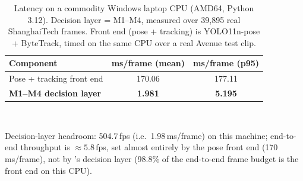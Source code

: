\begin{table}[t]
\centering
\caption{Latency on a commodity Windows laptop CPU (AMD64, Python 3.12).
Decision layer = M1--M4, measured over 39{,}895 real ShanghaiTech frames.
Front end (pose + tracking) is YOLO11n-pose + ByteTrack, timed on the same
CPU over a real Avenue test clip.}
\label{tab:cost}
\setlength{\tabcolsep}{6pt}
\renewcommand{\arraystretch}{1.15}
\footnotesize
\begin{tabular}{@{}lcc@{}}
\toprule
Component & ms/frame (mean) & ms/frame (p95) \\
\midrule
Pose + tracking front end   & 170.06 & 177.11 \\
\textbf{M1--M4 decision layer} & \textbf{1.981} & \textbf{5.195} \\
\bottomrule
\end{tabular}
\\[2pt]
\raggedright\footnotesize Decision-layer headroom: 504.7\,fps (i.e.\ 1.98\,ms/frame)
on this machine; end-to-end throughput is $\approx5.8$\,fps, set almost
entirely by the pose front end (170\,ms/frame), not by \method{}'s
decision layer (98.8\% of the end-to-end frame budget is the front end
on this CPU).
\end{table}
